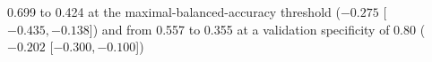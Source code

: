 0.699 to 0.424 at the maximal-balanced-accuracy threshold ($-0.275$ [$-0.435, -0.138$]) and from 0.557 to 0.355 at a validation specificity of 0.80 ($-0.202$ [$-0.300, -0.100$])%
